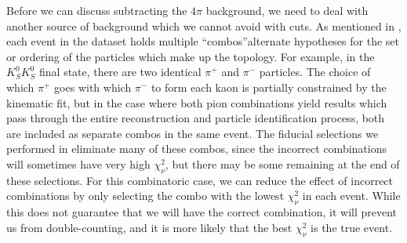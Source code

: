 Before we can discuss subtracting the $4\pi$ background, we need to deal with another source of background which we cannot avoid with cuts. As mentioned in , each event in the dataset holds multiple ``combos''\textemdash alternate hypotheses for the set or ordering of the particles which make up the topology. For example, in the $K_S^0K_S^0$ final state, there are two identical $\pi^+$ and $\pi^-$ particles. The choice of which $\pi^+$ goes with which $\pi^-$ to form each kaon is partially constrained by the kinematic fit, but in the case where both pion combinations yield results which pass through the entire reconstruction and particle identification process, both are included as separate combos in the same event. The fiducial selections we performed in  eliminate many of these combos, since the incorrect combinations will sometimes have very high $\chi^2_\nu$, but there may be some remaining at the end of these selections. For this combinatoric case, we can reduce the effect of incorrect combinations by only selecting the combo with the lowest $\chi^2_\nu$ in each event. While this does not guarantee that we will have the correct combination, it will prevent us from double-counting, and it is more likely that the best $\chi^2_\nu$ is the true event.

